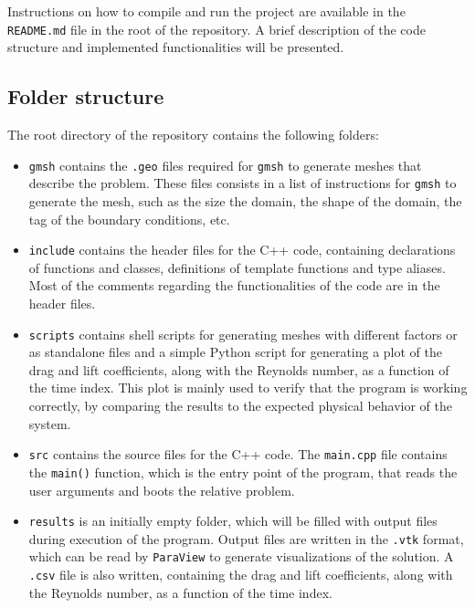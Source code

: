 Instructions on how to compile and run the project are available in the \texttt{README.md} file in the root of the repository. A brief description of the code structure and implemented functionalities will be presented.

\subsection{Folder structure}
The root directory of the repository contains the following folders:
\begin{itemize}
    \item \texttt{gmsh} contains the \texttt{.geo} files required for \texttt{gmsh} to generate meshes that describe the problem. These files consists in a list of instructions for \texttt{gmsh} to generate the mesh, such as the size the domain, the shape of the domain, the tag of the boundary conditions, etc.
    
    \item \texttt{include} contains the header files for the C++ code, containing declarations of functions and classes, definitions of template functions and type aliases. Most of the comments regarding the functionalities of the code are in the header files.
    
    \item \texttt{scripts} contains shell scripts for generating meshes with different factors or as standalone files and a simple Python script for generating a plot of the drag and lift coefficients, along with the Reynolds number, as a function of the time index. This plot is mainly used to verify that the program is working correctly, by comparing the results to the expected physical behavior of the system.
    
    \item \texttt{src} contains the source files for the C++ code. The \texttt{main.cpp} file contains the \texttt{main()} function, which is the entry point of the program, that reads the user arguments and boots the relative problem.

    \item \texttt{results} is an initially empty folder, which will be filled with output files during execution of the program. Output files are written in the \texttt{.vtk} format, which can be read by \texttt{ParaView} to generate visualizations of the solution. A \texttt{.csv} file is also written, containing the drag and lift coefficients, along with the Reynolds number, as a function of the time index.
    
\end{itemize}

